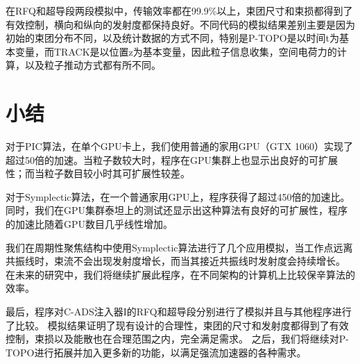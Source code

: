 在RFQ和超导段两段模拟中，传输效率都在99.9\%以上，束团尺寸和束损都得到了有效控制，横向和纵向的发射度都保持良好。不同代码的模拟结果差别主要是因为初始的束团分布不同，以及统计数据的方式不同，特别是P-TOPO是以时间t为基本变量，而TRACK是以位置z为基本变量，因此粒子信息收集，空间电荷力的计算，以及粒子推动方式都有所不同。

\section{小结}                \label{section:conclusion}
对于PIC算法，在单个GPU卡上，我们使用普通的家用GPU（GTX 1060）实现了超过50倍的加速。当粒子数较大时，程序在GPU集群上也显示出良好的可扩展性；而当粒子数目较小时其可扩展性较差。

对于Symplectic算法，在一个普通家用GPU上，程序获得了超过450倍的加速比。同时，我们在GPU集群泰坦上的测试还显示出这种算法有良好的可扩展性，程序的加速比随着GPU数目几乎线性增加。

我们在周期性聚焦结构中使用Symplectic算法进行了几个应用模拟，当工作点远离共振线时，束流不会出现发射度增长，而当其接近共振线时发射度会持续增长。
在未来的研究中，我们将继续扩展此程序，在不同架构的计算机上比较保辛算法的效率。

最后，程序对C-ADS注入器I的RFQ和超导段分别进行了模拟并且与其他程序进行了比较。
模拟结果证明了现有设计的合理性，束团的尺寸和发射度都得到了有效控制，束损以及能散也在合理范围之内，完全满足需求。
之后，我们将继续对P-TOPO进行拓展并加入更多新的功能，以满足强流加速器的各种需求。